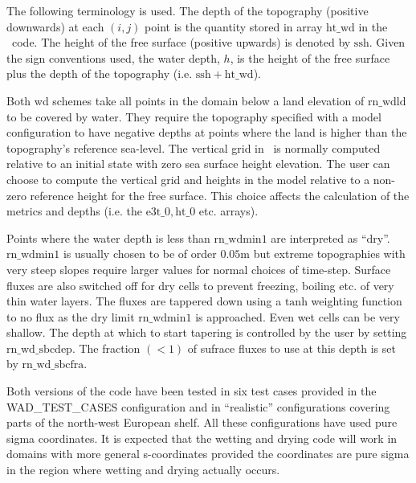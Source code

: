 \documentclass[../main/NEMO_manual]{subfiles}
\begin{document}
\begin{listing}
  \caption{}
  \label{lst:namwad}
\end{listing}

The following terminology is used. The depth of the topography (positive downwards)
at each $(i,j)$ point is the quantity stored in array $\mathrm{ht\_wd}$ in the \NEMO\ code.
The height of the free surface (positive upwards) is denoted by $ \mathrm{ssh}$. Given the sign
conventions used, the water depth, $h$, is the height of the free surface plus the depth of the
topography (i.e. $\mathrm{ssh} + \mathrm{ht\_wd}$).

Both wd schemes take all points in the domain below a land elevation of $\mathrm{rn\_wdld}$ to be
covered by water. They require the topography specified with a model
configuration to have negative depths at points where the land is higher than the
topography's reference sea-level. The vertical grid in \NEMO\ is normally computed relative to an
initial state with zero sea surface height elevation.
The user can choose to compute the vertical grid and heights in the model relative to
a non-zero reference height for the free surface. This choice affects the calculation of the metrics and depths
(i.e. the $\mathrm{e3t\_0, ht\_0}$ etc. arrays).

Points where the water depth is less than $\mathrm{rn\_wdmin1}$ are interpreted as ``dry''.
$\mathrm{rn\_wdmin1}$ is usually chosen to be of order $0.05$m but extreme topographies
with very steep slopes require larger values for normal choices of time-step. Surface fluxes
are also switched off for dry cells to prevent freezing, boiling etc. of very thin water layers.
The fluxes are tappered down using a $\mathrm{tanh}$ weighting function
to no flux as the dry limit $\mathrm{rn\_wdmin1}$ is approached. Even wet cells can be very shallow.
The depth at which to start tapering is controlled by the user by setting $\mathrm{rn\_wd\_sbcdep}$.
The fraction $(<1)$ of sufrace fluxes to use at this depth is set by $\mathrm{rn\_wd\_sbcfra}$.

Both versions of the code have been tested in six test cases provided in the WAD\_TEST\_CASES configuration
and in ``realistic'' configurations covering parts of the north-west European shelf.
All these configurations have used pure sigma coordinates. It is expected that
the wetting and drying code will work in domains with more general s-coordinates provided
the coordinates are pure sigma in the region where wetting and drying actually occurs.
\end{document}
